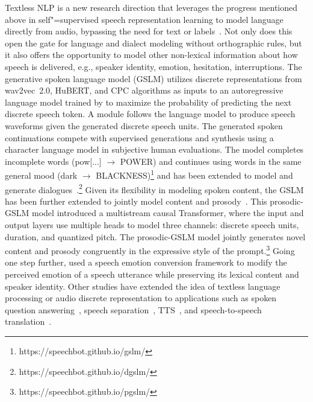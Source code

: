 Textless NLP is a new research direction that leverages the progress mentioned
above in self"=supervised speech representation learning to model language
directly from audio, bypassing the need for text or 
labels~\parencite{nguyen_generative_2022,polyak_speech_2021,kharitonov_textfree_2021,kreuk_textless_2022}. 
Not only does this open the gate for language and dialect modeling without
orthographic rules, but it also offers the opportunity to model other
non-lexical information about how speech is delivered, e.g., speaker identity,
emotion, hesitation, interruptions. 
The generative spoken language model (GSLM) \parencite{nguyen_generative_2022} utilizes discrete
representations from wav2vec~2.0, HuBERT, and CPC algorithms as inputs to an
autoregressive language model trained by  to maximize the
probability of predicting the next discrete speech token. A  module
follows the language model to produce speech waveforms given the generated
discrete speech units. The generated spoken continuations compete with
supervised generations and synthesis using a character language model in
subjective human evaluations. The model completes incomplete words
(pow[...] $\rightarrow$ POWER) and continues using words in the same general mood (dark $\rightarrow$
BLACKNESS)\footnote{https://speechbot.github.io/gslm/} and has been extended to
model and generate
dialogues~\parencite{nguyen_generative_2022}.\footnote{https://speechbot.github.io/dgslm/}
Given its flexibility in modeling spoken content, the GSLM has been further extended
to jointly model content and prosody~\parencite{kharitonov_textfree_2021}. This prosodic-GSLM model
introduced a multistream causal Transformer, where the input and output layers
use multiple heads to model three channels:  discrete speech units, duration,
and quantized pitch. The prosodic-GSLM model jointly generates novel content
and prosody congruently in the expressive 
style of the prompt.\footnote{https://speechbot.github.io/pgslm/}
Going one step further, \parencite{kreuk_textless_2022} used a speech emotion
conversion framework to modify the perceived emotion of a speech utterance
while preserving its lexical content and speaker identity. Other studies have
extended the idea of textless language processing or audio discrete representation to applications such as 
spoken question answering~\parencite{lin_dual_2022}, speech separation~\parencite{shi_discretization_2022}, TTS~\parencite{hayashi_discretalk_2020}, and speech-to-speech
translation~\parencite{lee_textless_2022}.



